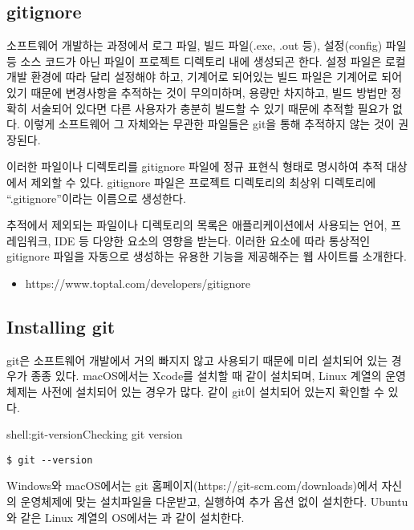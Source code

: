 \subsection*{gitignore}

소프트웨어 개발하는 과정에서 로그 파일, 빌드 파일(.exe, .out 등), 설정(config) 파일 등 소스 코드가 아닌 파일이 프로젝트 디렉토리 내에 생성되곤 한다. 설정 파일은 로컬 개발 환경에 따라 달리 설정해야 하고, 기계어로 되어있는 빌드 파일은 기계어로 되어있기 때문에 변경사항을 추적하는 것이 무의미하며, 용량만 차지하고, 빌드 방법만 정확히 서술되어 있다면 다른 사용자가 충분히 빌드할 수 있기 때문에 추적할 필요가 없다. 이렇게 소프트웨어 그 자체와는 무관한 파일들은 git을 통해 추적하지 않는 것이 권장된다.

이러한 파일이나 디렉토리를 gitignore 파일에 정규 표현식 형태로 명시하여 추적 대상에서 제외할 수 있다. gitignore 파일은 프로젝트 디렉토리의 최상위 디렉토리에 ``.gitignore''이라는 이름으로 생성한다. 

추적에서 제외되는 파일이나 디렉토리의 목록은 애플리케이션에서 사용되는 언어, 프레임워크, IDE 등 다양한 요소의 영향을 받는다. 이러한 요소에 따라 통상적인 gitignore 파일을 자동으로 생성하는 유용한 기능을 제공해주는 웹 사이트를 소개한다.

\begin{itemize}
    \item https://www.toptal.com/developers/gitignore
\end{itemize}

\subsection*{Installing git}

git은 소프트웨어 개발에서 거의 빠지지 않고 사용되기 때문에 미리 설치되어 있는 경우가 종종 있다. macOS에서는 Xcode를 설치할 때 같이 설치되며, Linux 계열의 운영체제는 사전에 설치되어 있는 경우가 많다. \과 같이 git이 설치되어 있는지 확인할 수 있다.

\begin{shellenv}{shell:git-version}{Checking git version}\begin{verbatim}
$ git --version
\end{verbatim}
\end{shellenv}

Windows와 macOS에서는 git 홈페이지(https://git-scm.com/downloads)에서 자신의 운영체제에 맞는 설치파일을 다운받고, 실행하여 추가 옵션 없이 설치한다. Ubuntu와 같은 Linux 계열의 OS에서는 과 같이 설치한다.

